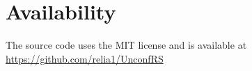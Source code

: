 \chapter{Availability}\label{ch:availability}
The source code uses the MIT license and is available at \hyperlink{UnconfRS}{https://github.com/relia1/UnconfRS}